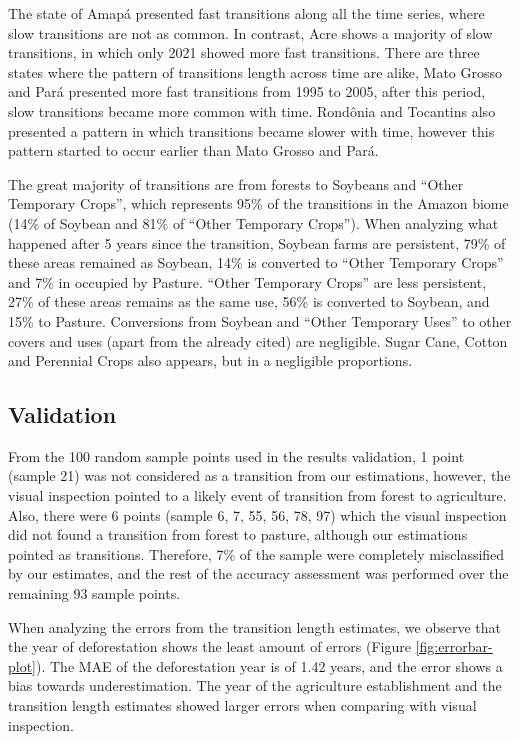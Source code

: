 \documentclass[essd, manuscript]{copernicus}
\begin{document}
The state of Amapá presented fast transitions along all the time series, where slow transitions are not as common.
In contrast, Acre shows a majority of slow transitions, in which only 2021 showed more fast transitions.
There are three states where the pattern of transitions length across time are alike, Mato Grosso and Pará presented more fast transitions from 1995 to 2005, after this period, slow transitions became more common with time.
Rondônia and Tocantins also presented a pattern in which transitions became slower with time, however this pattern started to occur earlier than Mato Grosso and Pará.

The great majority of transitions are from forests to Soybeans and ``Other Temporary Crops'', which represents 95\% of the transitions in the Amazon biome (14\% of Soybean and 81\% of ``Other Temporary Crops'').
When analyzing what happened after 5 years since the transition, Soybean farms are persistent, 79\% of these areas remained as Soybean, 14\% is converted to ``Other Temporary Crops'' and 7\% in occupied by Pasture.
``Other Temporary Crops'' are less persistent, 27\% of these areas remains as the same use, 56\% is converted to Soybean, and 15\% to Pasture.
Conversions from Soybean and ``Other Temporary Uses'' to other covers and uses (apart from the already cited) are negligible.
Sugar Cane, Cotton and Perennial Crops also appears, but in a negligible proportions.

\subsection{Validation}

From the 100 random sample points used in the results validation, 1 point (sample 21) was not considered as a transition from our estimations, however, the visual inspection pointed to a likely event of transition from forest to agriculture.
Also, there were 6 points (sample 6, 7, 55, 56, 78, 97) which the visual inspection did not found a transition from forest to pasture, although our estimations pointed as transitions.
Therefore, 7\% of the sample were completely misclassified by our estimates, and the rest of the accuracy assessment was performed over the remaining 93 sample points.

When analyzing the errors from the transition length estimates, we observe that the year of deforestation shows the least amount of errors (Figure \ref{fig:errorbar-plot}).
The MAE of the deforestation year is of 1.42 years, and the error shows a bias towards underestimation.
The year of the agriculture establishment and the transition length estimates showed larger errors when comparing with visual inspection.
\end{document}
